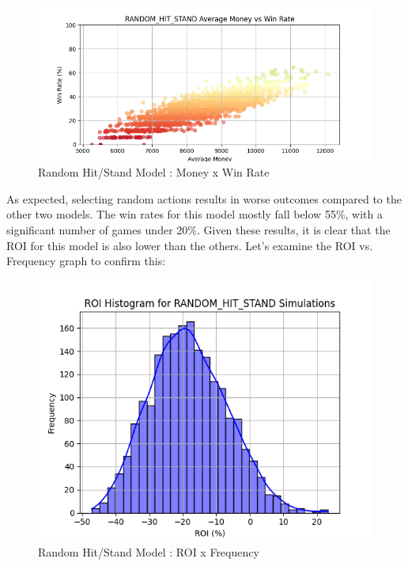 \documentclass[a4paper,12pt]{report}
\begin{document}
\begin{figure}[h]
\begin{center}
\includegraphics[scale=0.6]{figures/graphs/rhs_money_wr_big.png}
\end{center}
\caption{Random Hit/Stand Model : Money x Win Rate}
\label{fig:rhs_money_wr}
\end{figure}

As expected, selecting random actions results in worse outcomes compared to the other two models. The win rates for this model mostly fall below 55\%, with a significant number of games under 20\%. Given these results, it is clear that the ROI for this model is also lower than the others. Let's examine the ROI vs. Frequency graph to confirm this:

\begin{figure}[h]
\begin{center}
\includegraphics[scale=0.6]{figures/graphs/rhs_roi.png}
\end{center}
\caption{Random Hit/Stand Model : ROI x Frequency}
\label{fig:rhs_roi}
\end{figure}
\end{document}
